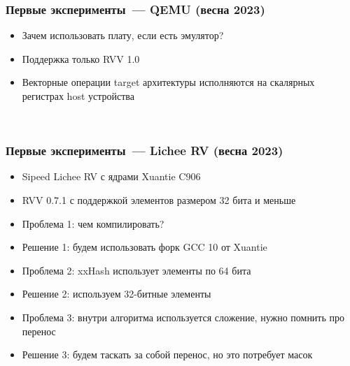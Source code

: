 \documentclass[
    aspectratio=169,
]{beamer}
\begin{document}
\begin{frame}
    \frametitle{Первые эксперименты~--- QEMU (весна 2023)}

    \begin{itemize}[<+->]
        \item Зачем использовать плату, если есть эмулятор?
        \item Поддержка только RVV 1.0
        \item Векторные операции target архитектуры исполняются на скалярных регистрах host устройства
    \end{itemize}

    \ %


\end{frame}

\begin{frame}
    \frametitle{Первые эксперименты~--- Lichee RV (весна 2023)}

    \begin{itemize}[<+->]
        \item Sipeed Lichee RV с ядрами Xuantie C906
        \item RVV 0.7.1 с поддержкой элементов размером 32 бита и меньше
        \item \textcolor{solarizedRed}{Проблема 1:} чем компилировать?
        \item \textcolor{solarizedGreen}{Решение 1:} будем использовать форк GCC 10 от Xuantie
        \item \textcolor{solarizedRed}{Проблема 2:} xxHash использует элементы по 64 бита
        \item \textcolor{solarizedGreen}{Решение 2:} используем 32-битные элементы
        \item \textcolor{solarizedRed}{Проблема 3:} внутри алгоритма используется сложение, нужно помнить про перенос
        \item \textcolor{solarizedGreen}{Решение 3:} будем таскать за собой перенос, но это потребует масок
    \end{itemize}

    \ %


\end{frame}
\end{document}
